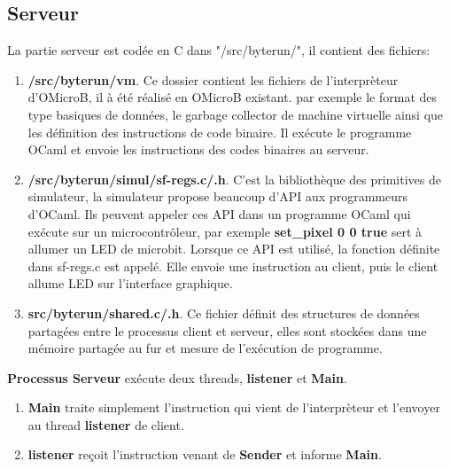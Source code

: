 \documentclass[14px]{article}
\begin{document}
\subsection{Serveur}
La partie serveur est codée en C dans "/src/byterun/", il contient des fichiers:
\begin{enumerate}
	\item \textbf{/src/byterun/vm}.
	Ce dossier contient les fichiers de l'interprèteur d'OMicroB, il à été réalisé en OMicroB existant. par exemple le format des type basiques de données, le garbage collector de machine virtuelle ainsi que les définition des instructions de code binaire. Il exécute le programme OCaml et envoie les instructions des codes binaires au serveur.

	\item \textbf{/src/byterun/simul/sf-regs.c/.h}.
	C'est la bibliothèque des primitives de simulateur, la simulateur propose beaucoup d'API aux programmeurs d'OCaml. Ils peuvent appeler ces API dans un programme OCaml qui exécute sur un microcontrôleur, par exemple \textbf{set\_pixel 0 0 true} sert à allumer un LED de microbit. Lorsque ce API est utilisé, la fonction définite dans sf-regs.c est appelé. Elle envoie une instruction au client, puis le client allume LED sur l'interface graphique.

	\item \textbf{src/byterun/shared.c/.h}.
	Ce fichier définit des structures de données partagées entre le processus client et serveur, elles sont stockées dans une mémoire partagée au fur et mesure de l'exécution de programme.
\end{enumerate}
\textbf{Processus Serveur} exécute deux threads, \textbf{listener} et \textbf{Main}.
\begin{enumerate}
	\item \textbf{Main} traite simplement l'instruction qui vient de l'interprèteur et l'envoyer au thread \textbf{listener} de client.
	\item \textbf{listener} reçoit l'instruction venant de \textbf{Sender} et informe \textbf{Main}.
\end{enumerate}
\end{document}
